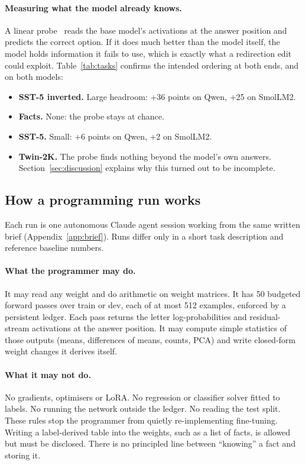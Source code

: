 \paragraph{Measuring what the model already knows.} A linear probe~\citep{alain2016probes} reads the base model's activations at the answer position and predicts the correct option. If it does much better than the model itself, the model holds information it fails to use, which is exactly what a redirection edit could exploit. Table~\ref{tab:tasks} confirms the intended ordering at both ends, and on both models:
\begin{itemize}
  \item \textbf{SST-5 inverted.} Large headroom: +36 points on Qwen, +25 on SmolLM2.
  \item \textbf{Facts.} None: the probe stays at chance.
  \item \textbf{SST-5.} Small: +6 points on Qwen, +2 on SmolLM2.
  \item \textbf{Twin-2K.} The probe finds nothing beyond the model's own answers. Section~\ref{sec:discussion} explains why this turned out to be incomplete.
\end{itemize}

\subsection{How a programming run works}
Each run is one autonomous Claude agent session working from the same written brief (Appendix~\ref{app:brief}). Runs differ only in a short task description and reference baseline numbers.

\paragraph{What the programmer may do.} It may read any weight and do arithmetic on weight matrices. It has 50 budgeted forward passes over train or dev, each of at most 512 examples, enforced by a persistent ledger. Each pass returns the letter log-probabilities and residual-stream activations at the answer position. It may compute simple statistics of those outputs (means, differences of means, counts, PCA) and write closed-form weight changes it derives itself.

\paragraph{What it may not do.} No gradients, optimisers or LoRA. No regression or classifier solver fitted to labels. No running the network outside the ledger. No reading the test split. These rules stop the programmer from quietly re-implementing fine-tuning. Writing a label-derived table into the weights, such as a list of facts, is allowed but must be disclosed. There is no principled line between ``knowing'' a fact and storing it.

